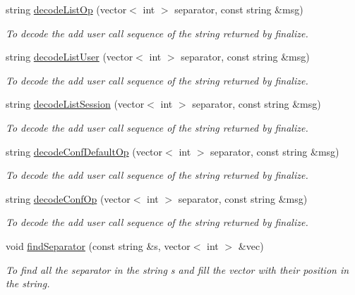\begin{DoxyCompactItemize}
string \hyperlink{classUMSMapper_a72267ca71cc620570a238dfec3f0519f}{decodeListOp} (vector$<$ int $>$ separator, const string \&msg)
\begin{DoxyCompactList}\small\item\em To decode the add user call sequence of the string returned by finalize. \item\end{DoxyCompactList}\item 
string \hyperlink{classUMSMapper_a569b2de623104e451711ff14b1f8f84f}{decodeListUser} (vector$<$ int $>$ separator, const string \&msg)
\begin{DoxyCompactList}\small\item\em To decode the add user call sequence of the string returned by finalize. \item\end{DoxyCompactList}\item 
string \hyperlink{classUMSMapper_a750e6d307c48491a86a97d694807ca66}{decodeListSession} (vector$<$ int $>$ separator, const string \&msg)
\begin{DoxyCompactList}\small\item\em To decode the add user call sequence of the string returned by finalize. \item\end{DoxyCompactList}\item 
string \hyperlink{classUMSMapper_ad157fb31bec53a8c140fb2e2d60465b3}{decodeConfDefaultOp} (vector$<$ int $>$ separator, const string \&msg)
\begin{DoxyCompactList}\small\item\em To decode the add user call sequence of the string returned by finalize. \item\end{DoxyCompactList}\item 
string \hyperlink{classUMSMapper_ac1f47841882d3f85b8820ab836789036}{decodeConfOp} (vector$<$ int $>$ separator, const string \&msg)
\begin{DoxyCompactList}\small\item\em To decode the add user call sequence of the string returned by finalize. \item\end{DoxyCompactList}\item 
void \hyperlink{classUMSMapper_a25dfdb771965482f87d2dea0cf206996}{findSeparator} (const string \&s, vector$<$ int $>$ \&vec)
\begin{DoxyCompactList}\small\item\em To find all the separator in the string s and fill the vector with their position in the string. \item\end{DoxyCompactList}\item 

\end{DoxyCompactItemize}
